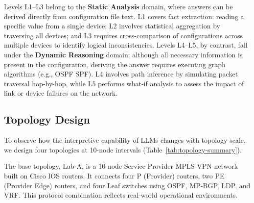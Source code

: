 Levels L1--L3 belong to the \textbf{Static Analysis} domain, where answers can be derived directly from configuration file text.
L1 covers fact extraction: reading a specific value from a single device; L2 involves statistical aggregation by traversing all devices; and L3 requires cross-comparison of configurations across multiple devices to identify logical inconsistencies.
Levels L4--L5, by contrast, fall under the \textbf{Dynamic Reasoning} domain: although all necessary information is present in the configuration, deriving the answer requires executing graph algorithms (e.g., OSPF SPF).
L4 involves path inference by simulating packet traversal hop-by-hop, while L5 performs what-if analysis to assess the impact of link or device failures on the network.



\subsection{Topology Design}


To observe how the interpretive capability of LLMs changes with topology scale, we design four topologies at 10-node intervals (Table~\ref{tab:topology-summary}).

The base topology, Lab-A, is a 10-node Service Provider MPLS VPN network built on Cisco IOS routers. It connects four P (Provider) routers, two PE (Provider Edge) routers, and four Leaf switches using OSPF, MP-BGP, LDP, and VRF. This protocol combination reflects real-world operational environments.

